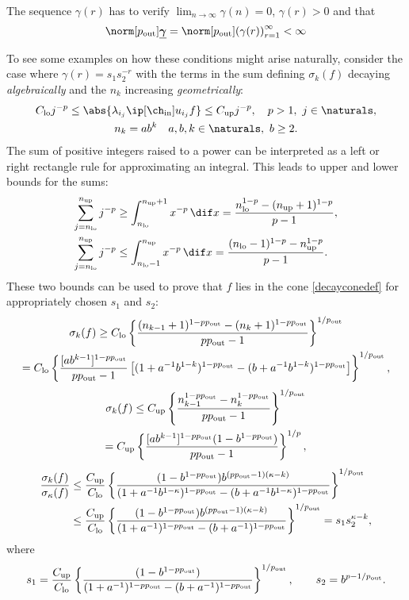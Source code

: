 \documentclass[final]{elsarticle}
\newcommand{\chin}{\ch_{\text{\rm{in}}}}
\newcommand{\pout}{p_{\text{\rm{out}}}}
\newcommand{\bgamma}{\underline{\boldsymbol\gamma}}
\theoremstyle{definition}
\theoremstyle{remark}
\DeclareMathOperator{\up}{up}
\DeclareMathOperator{\lo}{lo}
\begin{document}
The sequence $\gamma(r)$ has to verify $\lim_{n\rightarrow\infty}\gamma(n)=0$, $\gamma(r) > 0$ and that
\begin{equation} \label{constcone}
\norm[\pout]{\bgamma}=\norm[\pout]{ \left(\gamma(r)\right)_{r=1}^\infty}<\infty
\end{equation}

To see some examples on how these conditions might arise naturally, consider the case where $\gamma(r)=s_1s_2^{-r}$ with the terms in the sum defining $\sigma_k(f)$ decaying \emph{algebraically} and the $n_k$ increasing \emph{geometrically}:
\begin{gather*}
C_{\lo} j^{-p} \le \abs{\lambda_{i_j} \ip[\chin]{u_{i_j}}{f}} \le C_{\up} j^{-p}, \quad  p>1, \ j \in \naturals, \\
n_k = a b^k  \quad a, b, k \in \naturals, \ b \ge 2.
\end{gather*}
The sum of positive integers raised to a power can be interpreted as a left or right rectangle rule for approximating an integral.  This leads to upper and lower bounds for the sums:
\begin{align*}
\sum_{j=n_{\lo}}^{n_{\up}} j^{-p}  & \ge \int_{n_{\lo}}^{n_{\up}+1} x^{-p}\, \dif x  = \frac{n_{\lo} ^{1-p} - (n_{\up}+1)^{1-p}}{p-1}, \\
\sum_{j=n_{\lo}}^{n_{\up}} j^{-p}  & \le \int_{n_{\lo}-1}^{n_{\up}} x^{-p}\, \dif x = \frac{(n_{\lo}-1) ^{1-p} - n_{\up}^{1-p}}{p-1}.
\end{align*}
These two bounds can be used to prove that $f$ lies in the cone \eqref{decayconedef} for appropriately chosen $s_1$ and $s_2$:
\begin{multline*}
\sigma_k(f) \ge C_{\lo} \left\{\frac{(n_{k-1}+1) ^{1-p\pout} - (n_{k}+1)^{1-p \pout}}{p \pout-1}\right\}^{1/\pout} \\
= C_{\lo} \left\{\frac{[ab^{k-1}]^{1-p \pout}}{p \pout-1} \left[(1+a^{-1}b^{1-k})^{1-p \pout} - (b+a^{-1}b^{1-k})^{1-p \pout}\right] \right\}^{1/\pout},
\end{multline*}
\begin{multline*}
\sigma_k(f) \le C_{\up}\left\{\frac{n_{k-1} ^{1-p \pout} - n_{k}^{1-p \pout}}{p \pout-1}\right\}^{1/\pout} \\
= C_{\up}\left\{\frac{[ab^{k-1}]^{1-p \pout} (1 - b^{1-p \pout})}{p \pout-1}\right\}^{1/p} ,
\end{multline*}
\begin{align*}
\frac{\sigma_k(f)}{\sigma_\kappa(f)} &\le \frac{C_{\up}}  {C_{\lo}}
\left\{\frac{ (1 - b^{1-p \pout}) b^{(p \pout-1)(\kappa-k)} }  {(1+a^{-1}b^{1-\kappa})^{1-p\pout} - (b+a^{-1}b^{1-\kappa})^{1-p\pout}} \right\}^{1/\pout}\\
& \le \frac{C_{\up}}  {C_{\lo}}
\left\{\frac{(1 - b^{1-p\pout}) b^{(p\pout-1)(\kappa-k)} }  {(1+a^{-1})^{1-p\pout} - (b+a^{-1})^{1-p\pout}} \right\}^{1/\pout}   = s_1 s_2^{\kappa-k},
\end{align*}
where
\[
s_1 = \frac{ C_{\up}}  {C_{\lo}}\left\{\frac{(1 - b^{1-p\pout})}  {(1+a^{-1})^{1-p\pout} - (b+a^{-1})^{1-p\pout} } \right\}^{1/\pout}, \qquad s_2 = b^{p-1/\pout}.
\]
\end{document}
